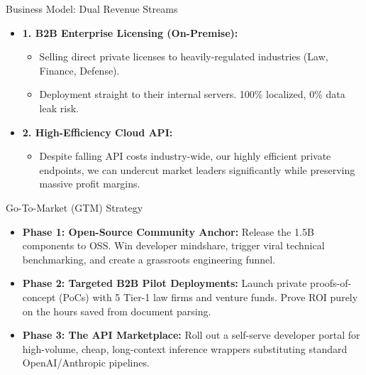 ﻿\documentclass[aspectratio=169, 10pt]{beamer}
\begin{document}
\begin{frame}{Business Model: Dual Revenue Streams}
\begin{itemize}
    \item \textbf{1. B2B Enterprise Licensing (On-Premise):}
    \begin{itemize}
        \item Selling direct private licenses to heavily-regulated industries (Law, Finance, Defense).
        \item Deployment straight to their internal servers. 100\% localized, 0\% data leak risk.
    \end{itemize}
    \item \textbf{2. High-Efficiency Cloud API:}
    \begin{itemize}
        \item Despite falling API costs industry-wide, our highly efficient private endpoints, we can undercut market leaders significantly while preserving massive profit margins.
    \end{itemize}
\end{itemize}
\end{frame}

\begin{frame}{Go-To-Market (GTM) Strategy}
\begin{itemize}
    \item \textbf{Phase 1: Open-Source Community Anchor:} Release the 1.5B components to OSS. Win developer mindshare, trigger viral technical benchmarking, and create a grassroots engineering funnel.
    \item \textbf{Phase 2: Targeted B2B Pilot Deployments:} Launch private proofs-of-concept (PoCs) with 5 Tier-1 law firms and venture funds. Prove ROI purely on the hours saved from document parsing.
    \item \textbf{Phase 3: The API Marketplace:} Roll out a self-serve developer portal for high-volume, cheap, long-context inference wrappers substituting standard OpenAI/Anthropic pipelines.
\end{itemize}
\end{frame}
\end{document}
